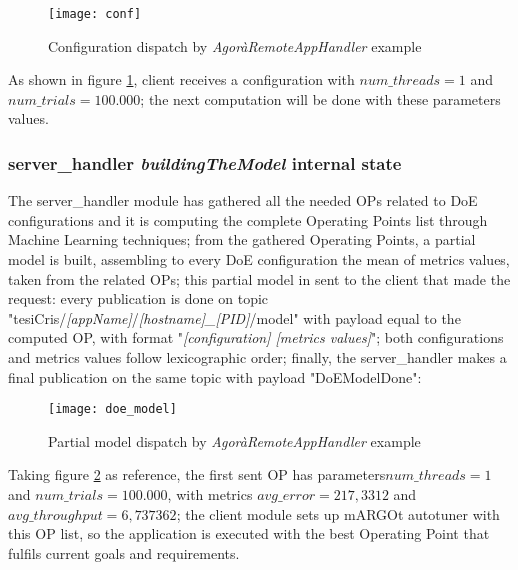 \begin{figure}[H]

    \centering
    \texttt{[image: conf]}
    \caption{Configuration dispatch by \textit{AgoràRemoteAppHandler} example}
    \label{fig:conf}
    
\end{figure}

As shown in figure \ref{fig:conf}, client receives a configuration with $num\_threads = 1$ and $num\_trials = 100.000$; the next computation will be done with these parameters values.


\subsubsection{server\_handler \textit{buildingTheModel} internal state}\label{DoEModelSend}

The server\_handler module has gathered all the needed OPs related to DoE configurations and it is computing the complete Operating Points list through Machine Learning techniques; from the gathered Operating Points, a partial model is built, assembling to every DoE configuration the mean of metrics values, taken from the related OPs; this partial model in sent to the client that made the request: every publication is done on topic "tesiCris/\textit{[appName]}/\textit{[hostname]\_[PID]}/model" with payload equal to the computed OP, with format "\textit{[configuration] [metrics values]}"; both configurations and metrics values follow lexicographic order; finally, the server\_handler makes a final publication on the same topic with payload "DoEModelDone":

\begin{figure}[H]

    \centering
    \texttt{[image: doe\_model]}
    \caption{Partial model dispatch by \textit{AgoràRemoteAppHandler} example}
    \label{fig:doe_model}
    
\end{figure}

Taking figure \ref{fig:doe_model} as reference, the first sent OP has parameters\linebreak $num\_threads = 1$ and $num\_trials = 100.000$, with metrics $avg\_error = 217,3312$ and $avg\_throughput = 6,737362$; the client module sets up mARGOt autotuner with this OP list, so the application is executed with the best Operating Point that fulfils current goals and requirements.

